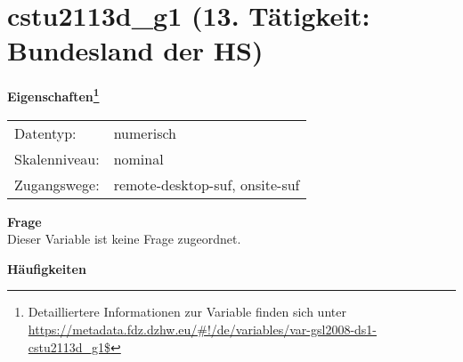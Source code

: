 
    \setcounter{footnote}{0}

    \vspace*{-1.8cm}
	\section{cstu2113d\_g1 (13. Tätigkeit: Bundesland der HS)}
	\label{section:cstu2113d_g1}



    \vspace*{0.5cm}
    \noindent\textbf{Eigenschaften\footnote{Detailliertere Informationen zur Variable finden sich unter
		\url{https://metadata.fdz.dzhw.eu/\#!/de/variables/var-gsl2008-ds1-cstu2113d_g1$}}}\\
	\begin{tabularx}{\hsize}{@{}lX}
	Datentyp: & numerisch \\
	Skalenniveau: & nominal \\
	Zugangswege: &
	  remote-desktop-suf, 
	  onsite-suf
 \\
    \end{tabularx}



		\vspace*{0.5cm}
		\noindent\textbf{Frage}\\
		Dieser Variable ist keine Frage zugeordnet.





        		\vspace*{0.5cm}
                \noindent\textbf{Häufigkeiten}


